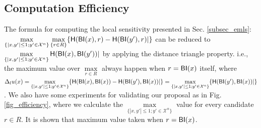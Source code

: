 \documentclass[sigconf, anonymous]{acmart}
\begin{document}
\subsection{Computation Efficiency}
\label{subsec_effi}
The formula for computing the local sensitivity presented in Sec. \ref{subsec_emls}:$\max\limits_{\{|x,y'| \leq 1; y'\in \mathcal{X}^n\}}\max\limits_{\{r\in R\}} \{\mathsf{H}(\mathsf{BI}(x), r) - \mathsf{H}(\mathsf{BI}(y'), r)|\}$ can be reduced to $\max\limits_{\{|x,y'| \leq 1;y'\in \mathcal{X}^n\}}\mathsf{H}(\mathsf{BI}(x), \mathsf{BI}(y'))|$ by applying the distance triangle property. i.e., the maximum value over $\max\limits_{r \in R}$ always happen when $r = \mathsf{BI}(x)$ itself, where $\Delta_{l}u(x) = \max\limits_{\{|x,y'| \leq 1;y'\in \mathcal{X}^n\}} \{\mathsf{H}(\mathsf{BI}(x), \mathsf{BI}(x)) - \mathsf{H}(\mathsf{BI}(y'), \mathsf{BI}(x))|\} = \max\limits_{\{|x,y'| \leq 1;y'\in \mathcal{X}^n\}} \{\mathsf{H}(\mathsf{BI}(y'), \mathsf{BI}(x))|\}$. We also have some experiments for validating our proposal as in Fig. \ref{fig_efficiency}, where we calculate the $\max\limits_{\{|x,y'| \leq 1;y'\in \mathcal{X}^n\}}$ value for every candidate $r \in R$. It is shown that maximum value taken when  $r = \mathsf{BI}(x)$.



\end{document}
